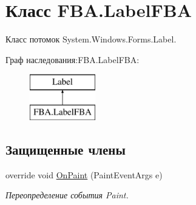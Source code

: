 \hypertarget{class_f_b_a_1_1_label_f_b_a}{}\section{Класс F\+B\+A.\+Label\+F\+BA}
\label{class_f_b_a_1_1_label_f_b_a}


Класс потомок System.\+Windows.\+Forms.\+Label.  


Граф наследования\+:F\+B\+A.\+Label\+F\+BA\+:\begin{figure}[H]
\begin{center}
\leavevmode
\includegraphics[height=2.000000cm]{class_f_b_a_1_1_label_f_b_a}
\end{center}
\end{figure}
\subsection*{Защищенные члены}
\begin{DoxyCompactItemize}
\item 
override void \mbox{\hyperlink{class_f_b_a_1_1_label_f_b_a_ace0518fe77037fe116b9cf025974f25e}{On\+Paint}} (Paint\+Event\+Args e)
\begin{DoxyCompactList}\small\item\em Переопределение события Paint. \end{DoxyCompactList}\end{DoxyCompactItemize}
